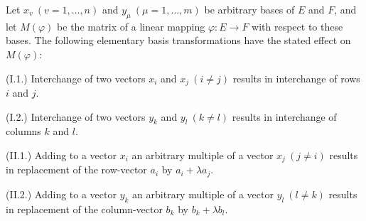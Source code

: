 Let $x_v\ (v = 1, \dots, n)$ and $y_\mu\ (\mu = 1, \dots, m)$ be arbitrary bases of $E$ and $F$, and let $M(\varphi)$ be the matrix of a linear mapping $\varphi: E \to F$ with respect to these bases. The following elementary basis transformations have the stated effect on $M(\varphi)$:

(I.1.) Interchange of two vectors $x_i$ and $x_j\ (i \neq j)$ results in interchange of rows $i$ and $j$.

(I.2.) Interchange of two vectors $y_k$ and $y_l\ (k \neq l)$ results in interchange of columns $k$ and $l$.

(II.1.) Adding to a vector $x_i$ an arbitrary multiple of a vector $x_j\ (j \neq i)$ results in replacement of the row-vector $a_i$ by $a_i + \lambda a_j$.

(II.2.) Adding to a vector $y_k$ an arbitrary multiple of a vector $y_l\ (l \neq k)$ results in replacement of the column-vector $b_k$ by $b_k + \lambda b_l$.
